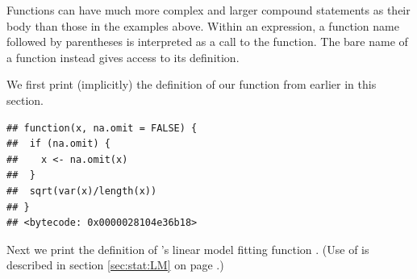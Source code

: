 \documentclass[krantz2]{krantz}\usepackage{knitr}
\begin{document}
Functions can have much more complex and larger compound statements as their body than those in the examples above. Within an expression, a function name followed by parentheses is interpreted as a call to the function. The bare name of a function instead gives access to its definition.

We first print (implicitly) the definition of our function from earlier in this section.

\begin{knitrout}\footnotesize
{}\color{fgcolor}\begin{kframe}
\begin{alltt}
\end{alltt}
\begin{verbatim}
## function(x, na.omit = FALSE) {
##  if (na.omit) {
##    x <- na.omit(x)
##  }
##  sqrt(var(x)/length(x))
## }
## <bytecode: 0x0000028104e36b18>
\end{verbatim}
\end{kframe}
\end{knitrout}

Next we print the definition of \Rlang's linear model fitting function . (Use of  is described in section \ref{sec:stat:LM} on page \pageref{sec:stat:LM}.)
\end{document}
